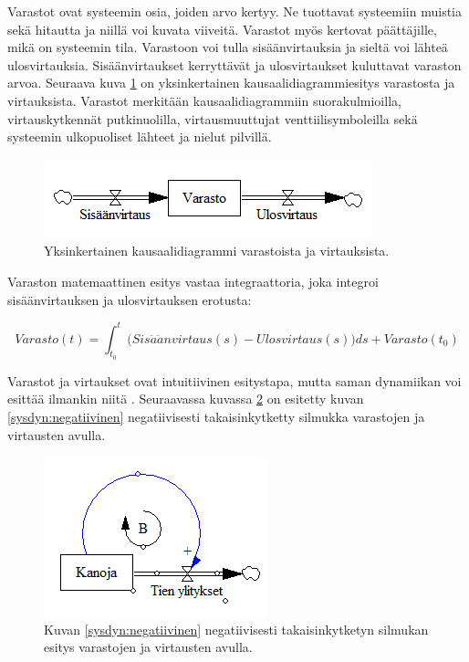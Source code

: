 \documentclass[finnish,12pt,a4paper,pdftex]{article}
\begin{document}
\begin{onehalfspacing}
Varastot ovat systeemin osia, joiden arvo kertyy. Ne tuottavat systeemiin muistia sekä hitautta ja niillä voi kuvata viiveitä. Varastot myös kertovat päättäjille, mikä on systeemin tila. Varastoon voi tulla sisäänvirtauksia ja sieltä voi lähteä ulosvirtauksia. Sisäänvirtaukset kerryttävät ja ulosvirtaukset kuluttavat varaston arvoa. Seuraava kuva \ref{sysdyn:varastovirtaus} on yksinkertainen kausaalidiagrammiesitys varastosta ja virtauksista. Varastot merkitään kausaalidiagrammiin suorakulmioilla, virtauskytkennät putkinuolilla, virtausmuuttujat venttiilisymboleilla sekä systeemin ulkopuoliset lähteet ja nielut pilvillä. \cite[s. 191--197]{Sterman2000} 

\begin{figure}[H]
\centering \includegraphics{varastovirtaus}
\caption{Yksinkertainen kausaalidiagrammi varastoista ja virtauksista. \cite[s. 150]{Sterman2000} \label{sysdyn:varastovirtaus}}
\end{figure}

Varaston matemaattinen esitys vastaa integraattoria, joka integroi sisäänvirtauksen ja ulosvirtauksen erotusta: 

\begin{equation}
  Varasto(t) = \int_{t_0}^t \Big( Sis\ddot{a}\ddot{a}nvirtaus(s) - Ulosvirtaus(s) \Big) ds + Varasto(t_0) 
\end{equation} \cite[s. 194--195]{Sterman2000} 

Varastot ja virtaukset ovat intuitiivinen esitystapa, mutta saman dynamiikan voi esittää ilmankin niitä \cite[s. 191--230]{Sterman2000}. Seuraavassa kuvassa \ref{sysdyn:varastovirtauskana} on esitetty kuvan \ref{sysdyn:negatiivinen} negatiivisesti takaisinkytketty silmukka varastojen ja virtausten avulla. 

\begin{figure}[H]
\centering \includegraphics{varastovirtauskana}
\caption{Kuvan \ref{sysdyn:negatiivinen} negatiivisesti takaisinkytketyn silmukan esitys varastojen ja virtausten avulla. \label{sysdyn:varastovirtauskana}}
\end{figure}


\end{onehalfspacing}
\end{document}
